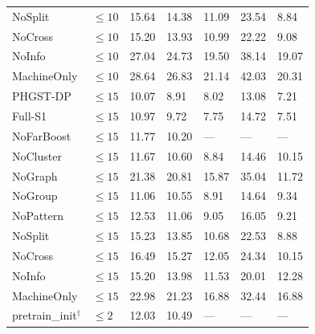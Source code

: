 \begin{table}[p]
\begin{tabularx}{\textwidth}{@{}lXXXXXX@{}}
NoSplit & $\le 10$ & 15.64 & 14.38 & 11.09 & 23.54 & 8.84 \\
NoCross & $\le 10$ & 15.20 & 13.93 & 10.99 & 22.22 & 9.08 \\
NoInfo & $\le 10$ & 27.04 & 24.73 & 19.50 & 38.14 & 19.07 \\
MachineOnly & $\le 10$ & 28.64 & 26.83 & 21.14 & 42.03 & 20.31 \\
\midrule
PHGST-DP & $\le 15$ & 10.07 & 8.91 & 8.02 & 13.08 & 7.21 \\
Full-S1 & $\le 15$ & 10.97 & 9.72 & 7.75 & 14.72 & 7.51 \\
NoFarBoost & $\le 15$ & 11.77 & 10.20 & --- & --- & --- \\
NoCluster & $\le 15$ & 11.67 & 10.60 & 8.84 & 14.46 & 10.15 \\
NoGraph & $\le 15$ & 21.38 & 20.81 & 15.87 & 35.04 & 11.72 \\
NoGroup & $\le 15$ & 11.06 & 10.55 & 8.91 & 14.64 & 9.34 \\
NoPattern & $\le 15$ & 12.53 & 11.06 & 9.05 & 16.05 & 9.21 \\
NoSplit & $\le 15$ & 15.23 & 13.85 & 10.68 & 22.53 & 8.88 \\
NoCross & $\le 15$ & 16.49 & 15.27 & 12.05 & 24.34 & 10.15 \\
NoInfo & $\le 15$ & 15.20 & 13.98 & 11.53 & 20.01 & 12.28 \\
MachineOnly & $\le 15$ & 22.98 & 21.23 & 16.88 & 32.44 & 16.88 \\
\midrule
pretrain\_init$^\dagger$ & $\le 2$ & 12.03 & 10.49 & --- & --- & --- \\
\bottomrule
\end{tabularx}
\end{table}

